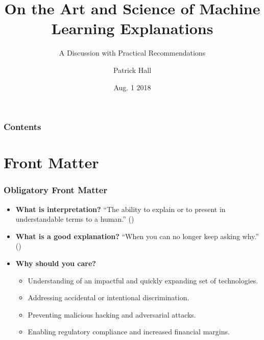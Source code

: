 \documentclass[11pt,
               aspectratio=169
               ]{beamer}
\author{Patrick Hall}
\title{On the Art and Science of Machine Learning Explanations}
\subtitle{A Discussion with Practical Recommendations}
\institute{\href{https://www.h2o.ai}{H\textsubscript{2}O.ai}}
\date{Aug. 1 2018}
\begin{document}
	
	\maketitle
	
	\begin{frame}
	
		\frametitle{Contents}
		
		\tableofcontents{}
		
	\end{frame}

	\section{Front Matter}
	
		\begin{frame}
		
			\frametitle{Obligatory Front Matter}
			
				\begin{itemize}
					
					\item \textbf{What is interpretation?} ``The ability	to explain or to present in understandable terms to	a human.'' (\cite{been_kim1})
					
					\item \textbf{What is a good explanation?} ``When you can no longer keep asking why.'' (\cite{gilpin2018explaining})
					
					\item \textbf{Why should you care?}
					\begin{itemize}
						\item Understanding of an impactful and quickly expanding set of technologies. 
						\item Addressing accidental or intentional discrimination.
						\item Preventing malicious hacking and adversarial attacks.
						\item Enabling regulatory compliance and increased financial margins.
					\end{itemize}
					
				\end{itemize}
			
		\end{frame}

\end{document}
